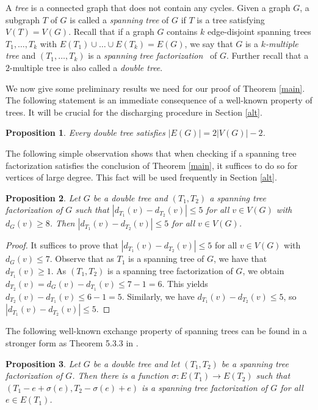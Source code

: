 \documentclass{article}
\theoremstyle{plain}
\newtheorem{Proposition}{Proposition}
\theoremstyle{nonumberplain}
\theoremstyle{nonumberplain}
\newcommand{\stf}{spanning tree factorization }
\begin{document}
A {\it tree} is a connected graph that does not contain any cycles. Given a graph $G$, a subgraph $T$ of $G$ is called a {\it spanning tree} of $G$ if $T$ is a tree satisfying $V(T)=V(G)$. Recall that if a graph $G$ contains $k$ edge-disjoint spanning trees $T_1,\ldots, T_k$ with $E(T_1)\cup \ldots \cup E(T_k)=E(G)$, we say that $G$ is a {\it $k$-multiple tree} and $(T_1,\ldots,T_k)$ is a {\it \stf}\ of $G$. Further recall that a $2$-multiple tree is also called a {\it double tree}.


We now give some preliminary results we need for our proof of Theorem \ref{main}. The following statement is an immediate consequence of a well-known property of trees. It will be crucial for the discharging procedure in Section \ref{alt}.
\begin{Proposition}\label{aretes}
Every double tree satisfies $|E(G)|=2|V(G)|-2$.
\end{Proposition}
The following simple observation shows that when checking if a \stf satisfies the conclusion of Theorem \ref{main}, it suffices to do so for vertices of large degree. This fact will be used frequently in Section \ref{alt}.
\begin{Proposition}\label{trivial}
Let $G$ be a double tree and $(T_1,T_2)$ a \stf of $G$ such that $|d_{T_1}(v)-d_{T_2}(v)|\leq 5$ for all $v \in V(G)$ with $d_G(v)\geq 8$. Then $|d_{T_1}(v)-d_{T_2}(v)|\leq 5$ for all $v \in V(G)$.
\end{Proposition}
\begin{proof}
It suffices to prove that $|d_{T_1}(v)-d_{T_2}(v)|\leq 5$ for all $v \in V(G)$ with $d_G(v)\leq 7$. Observe that as $T_1$ is a spanning tree of $G$, we have that $d_{T_1}(v)\geq 1$. As $(T_1,T_2)$ is a \stf of $G$, we obtain $d_{T_2}(v)=d_G(v)- d_{T_1}(v)\leq 7-1=6$. This yields $d_{T_2}(v)-d_{T_1}(v)\leq 6-1=5$. Similarly, we have $d_{T_1}(v)-d_{T_2}(v)\leq 5$, so $|d_{T_1}(v)-d_{T_2}(v)|\leq 5$.
\end{proof}
The following well-known exchange property of spanning trees can be found in a stronger form as Theorem 5.3.3  in \cite{book}.
\begin{Proposition}\label{map}
Let $G$ be a double tree and let $(T_1,T_2)$ be a \stf of $G$. Then there is a function $\sigma:E(T_1)\rightarrow E(T_2)$ such that $(T_1-e+\sigma(e),T_2-\sigma(e)+e)$ is a \stf of $G$ for all $e \in E(T_1)$.
\end{Proposition}
\end{document}
